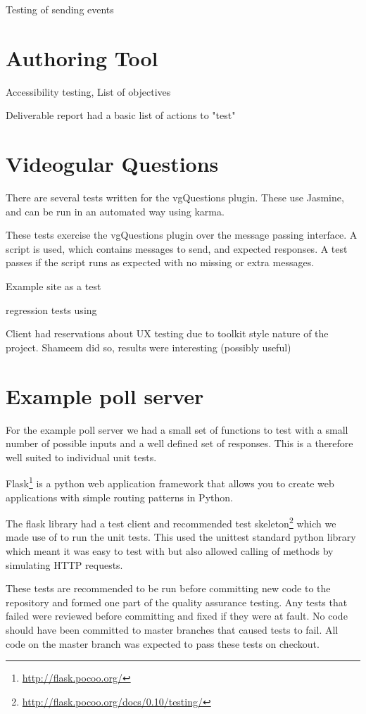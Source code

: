 Testing of sending events

\section{Authoring Tool}

Accessibility testing, List of objectives

Deliverable report had a basic list of actions to "test"

\section{Videogular Questions}

There are several tests written for the vgQuestions plugin. These use Jasmine, and can be run in an automated way using karma.

These tests exercise the vgQuestions plugin over the message passing interface. A script is used, which contains messages to send, and expected responses. A test passes if the script runs as expected with no missing or extra messages.

Example site as a test

regression tests using 

Client had reservations about UX testing due to toolkit style nature of the project. Shameem did so, results were interesting (possibly useful)

\section{Example poll server}

For the example poll server we had a small set of functions to test with a small number of possible inputs and a well defined set of responses. This is a therefore well suited to individual unit tests.

Flask\footnote{\url{http://flask.pocoo.org/}} is a python web application framework that allows you to create web applications with simple routing patterns in Python.

The flask library had a test client and recommended test skeleton\footnote{\url{http://flask.pocoo.org/docs/0.10/testing/}} which we made use of to run the unit tests. This used the unittest standard python library which meant it was easy to test with but also allowed calling of methods by simulating HTTP requests.

These tests are recommended to be run before committing new code to the repository and formed one part of the quality assurance testing. Any tests that failed were reviewed before committing and fixed if they were at fault. No code should have been committed to master branches that caused tests to fail. All code on the master branch was expected to pass these tests on checkout.

